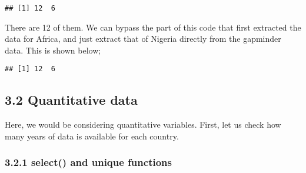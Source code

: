\documentclass[]{article}
\newenvironment{Shaded}{\begin{snugshade}}{\end{snugshade}}
\newcommand{\KeywordTok}[1]{\textcolor[rgb]{0.13,0.29,0.53}{\textbf{{#1}}}}
\newcommand{\StringTok}[1]{\textcolor[rgb]{0.31,0.60,0.02}{{#1}}}
\newcommand{\CommentTok}[1]{\textcolor[rgb]{0.56,0.35,0.01}{\textit{{#1}}}}
\newcommand{\NormalTok}[1]{{#1}}
\begin{document}
\begin{Shaded}
\end{Shaded}

\begin{verbatim}
## [1] 12  6
\end{verbatim}

There are 12 of them. We can bypass the part of this code that first
extracted the data for Africa, and just extract that of Nigeria directly
from the gapminder data. This is shown below;

\begin{Shaded}
\end{Shaded}

\begin{verbatim}
## [1] 12  6
\end{verbatim}

\subsection{3.2 Quantitative data}\label{quantitative-data}

Here, we would be considering quantitative variables. First, let us
check how many years of data is available for each country.

\subsubsection{\texorpdfstring{3.2.1 \textbf{select()} and
\textbf{unique}
functions}{3.2.1 select() and unique functions}}\label{select-and-unique-functions}
\end{document}
